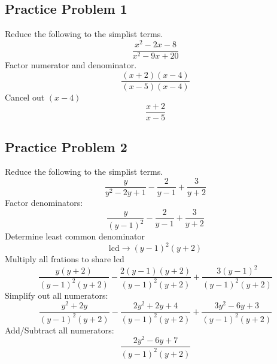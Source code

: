 \documentclass[12pt, letterpaper, oneside]{book}
\begin{document}
\subsection{Practice Problem 1}
Reduce the following to the simplist terms.
\[\frac{x^2-2x-8}{x^2-9x+20}\]
Factor numerator and denominator.
\[\frac{(x+2)(x-4)}{(x-5)(x-4)}\]
Cancel out $(x-4)$
\[\frac{x+2}{x-5}\]

\subsection{Practice Problem 2}
Reduce the following to the simplist terms.
\[\frac{y}{y^2-2y+1} - \frac{2}{y-1} + \frac{3}{y+2}\]
Factor denominators:
\[\frac{y}{(y-1)^2} - \frac{2}{y-1} + \frac{3}{y+2}\]
Determine least common denominator
\[\text{lcd} \rightarrow (y-1)^2(y+2)\]
Multiply all frations to share lcd
\[\frac{y(y+2)}{(y-1)^2(y+2)} - \frac{2(y-1)(y+2)}{(y-1)^2(y+2)} + \frac{3(y-1)^2}{(y-1)^2(y+2)}\]
Simplify out all numerators:
\[\frac{y^2+2y}{(y-1)^2(y+2)} - \frac{2y^2 + 2y + 4}{(y-1)^2(y+2)} + \frac{3y^2 - 6y +3}{(y-1)^2(y+2)}\]
Add/Subtract all numerators:
\[\frac{2y^2-6y+7}{(y-1)^2(y+2)}\]
\end{document}
